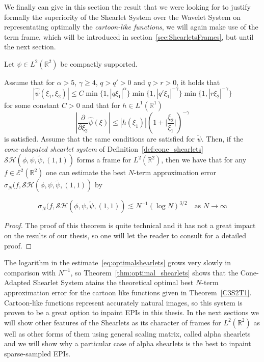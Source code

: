 We finally can give in this section the result that we were looking for to justify formally the superiority of the Shearlet System over the Wavelet System on representating optimally the \textit{cartoon-like functions}, we will again make use of the term frame, which will be introduced in section~\ref{sec:ShearletsFrames}, but until the next section.

\begin{thm}
\label{thm:optimal_shearlets}
Let $\psi\in L^2(\mathbb{R}^2)$ be compactly supported.

Assume that  for $\alpha>5$, $\gamma\geq 4$, $q>q'>0$ and $q>r>0$, it holds that
\begin{equation}
\label{eq:boundframe}
|\hat{\psi}(\xi_1,\xi_2)|\leq C \min\{1,|q\xi_1|^{\alpha}\}\min\{1,|q'\xi_1|^{-\gamma}\}\min\{1,|r\xi_2|^{-\gamma}\}
\end{equation}
for some constant $C>0$ and that for $h\in L^1(\mathbb{R}^1)$ 
$$
|\frac{\partial}{\partial\xi_2}\hat{\psi}(\xi)|\leq |h(\xi_1)|\left(1+\big| \frac{\xi_2}{\xi_1}\big|\right)^{-\gamma}
$$
is satisfied. Assume that the same conditions are satisfied for $\tilde{\psi}$. Then, if the \textit{cone-adapated shearlet system} of Definition~\ref{def:cone_shearlets} $\mathcal{SH}(\phi,\psi,\tilde{\psi},(1,1))$ forms a frame for $L^2(\mathbb{R}^2)$, then we have that for any $f\in \mathcal{E}^2(\mathbb{R}^2)$ one can estimate the best $N$-term approximation error $\sigma_N(f,\mathcal{SH}(\phi,\psi,\tilde{\psi},(1,1))$ by

\begin{equation}
\label{eq:optimalshearlets}
\sigma_N(f,\mathcal{SH}(\phi,\psi,\tilde{\psi},(1,1))\lesssim N^{-1}(\log N)^{3/2} \quad \text{as  } N\longrightarrow\infty
\end{equation}
\end{thm}
\begin{proof}
The proof of this theorem is quite technical and it has not a great impact on the results of our thesis, so one will let the reader to consult \cite{FirstShearlets} for a detailed proof. 
\end{proof}

The logarithm in the estimate~\ref{eq:optimalshearlets} grows very slowly in comparison with $N^{-1}$, so Theorem~\ref{thm:optimal_shearlets} shows that the Cone-Adapted Shearlet System atains the theoretical optimal best $N$-term approximation error for the cartoon like functions given in Theorem~\ref{C3S2T1}. Cartoon-like functions represent accurately natural images, so this system is proven to be a great option to inpaint EPIs in this thesis. In the next sections we will show other features of the Shearlets as its character of frames for $L^2(\mathbb{R}^2)$ as well as other forms of them using general scaling matrix, called alpha shearlets and we will show why a particular case of alpha shearlets is the best to inpaint sparse-sampled EPIs.

